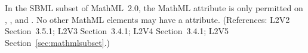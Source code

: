 In the SBML subset of MathML~2.0, the MathML attribute
 is only permitted on , ,
and .  No other
MathML elements may have a  attribute.  (References:
L2V2 Section~3.5.1; L2V3 Section~3.4.1; L2V4 Section~3.4.1; 
L2V5 Section~\ref{sec:mathmlsubset}.)
